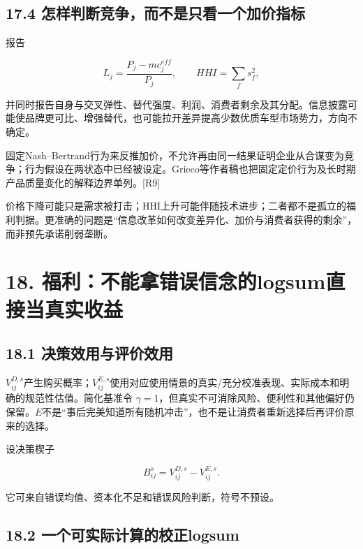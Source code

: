 \documentclass[
  11pt,
]{article}
\begin{document}
\subsection{17.4
怎样判断竞争，而不是只看一个加价指标}\label{ux600eux6837ux5224ux65adux7adeux4e89ux800cux4e0dux662fux53eaux770bux4e00ux4e2aux52a0ux4ef7ux6307ux6807}

报告

\[
L_j=\frac{P_j-mc_j^{eff}}{P_j},\qquad
HHI=\sum_fs_f^2,
\tag{78}
\]

并同时报告自身与交叉弹性、替代强度、利润、消费者剩余及其分配。信息披露可能使品牌更可比、增强替代，也可能拉开差异提高少数优质车型市场势力，方向不确定。

固定Nash--Bertrand行为来反推加价，不允许再由同一结果证明企业从合谋变为竞争；行为假设在两状态中已经被设定。Grieco等作者稿也把固定定价行为及长时期产品质量变化的解释边界单列。{[}R9{]}

价格下降可能只是需求被打击；HHI上升可能伴随技术进步；二者都不是孤立的福利判据。更准确的问题是``信息改革如何改变差异化、加价与消费者获得的剩余''，而非预先承诺削弱垄断。

\section{18.
福利：不能拿错误信念的logsum直接当真实收益}\label{ux798fux5229ux4e0dux80fdux62ffux9519ux8befux4fe1ux5ff5ux7684logsumux76f4ux63a5ux5f53ux771fux5b9eux6536ux76ca}

\subsection{18.1
决策效用与评价效用}\label{ux51b3ux7b56ux6548ux7528ux4e0eux8bc4ux4ef7ux6548ux7528}

\(V_{ij}^{D,s}\)产生购买概率；\(V_{ij}^{E,s}\)使用对应使用情景的真实/充分校准表现、实际成本和明确的规范性估值。简化基准令
\(\gamma=1\)，但真实不可消除风险、便利性和其他偏好仍保留。\(E\)不是``事后完美知道所有随机冲击''，也不是让消费者重新选择后再评价原来的选择。

设决策楔子

\[
B_{ij}^{s}=V_{ij}^{D,s}-V_{ij}^{E,s}.
\tag{79}
\]

它可来自错误均值、资本化不足和错误风险判断，符号不预设。

\subsection{18.2
一个可实际计算的校正logsum}\label{ux4e00ux4e2aux53efux5b9eux9645ux8ba1ux7b97ux7684ux6821ux6b63logsum}
\end{document}
